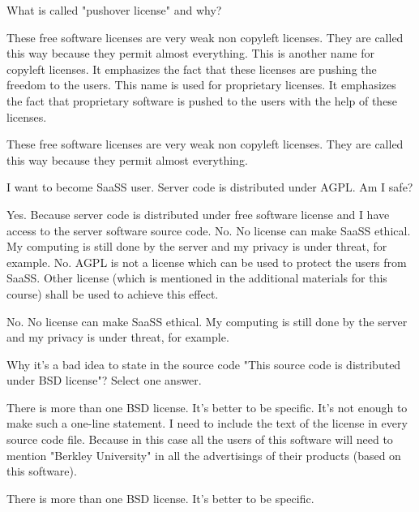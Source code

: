 \begin{question}[type=exam]
What is called "pushover license" and why?
\begin{itemize}
\chk These free software licenses are very weak non copyleft licenses. They are called this way because they permit almost everything.
\chk This is another name for copyleft licenses. It emphasizes the fact that these licenses are pushing the freedom to the users.
\chk This name is used for proprietary licenses. It emphasizes the fact that proprietary software is pushed to the users with the help of these licenses.
\end{itemize}
\end{question}
\begin{solution}
These free software licenses are very weak non copyleft licenses. They are called this way because they permit almost everything.
\end{solution}


\begin{question}[type=exam]
I want to become SaaSS user. Server code is distributed under AGPL. Am I safe?
\begin{itemize}
\chk Yes. Because server code is distributed under free software license and I have access to the server software source code.
\chk No. No license can make SaaSS ethical. My computing is still done by the server and my privacy is under threat, for example.
\chk No. AGPL is not a license which can be used to protect the users from SaaSS. Other license (which is mentioned in the additional materials for this course) shall be used to achieve this effect.
\end{itemize}
\end{question}
\begin{solution}
No. No license can make SaaSS ethical. My computing is still done by the server and my privacy is under threat, for example.
\end{solution}


\begin{question}[type=exam]
Why it's a bad idea to state in the source code "This source code is distributed under BSD license"? Select one answer.
\begin{itemize}
\chk There is more than one BSD license. It's better to be specific.
\chk It's not enough to make such a one-line statement. I need to include the text of the license in every source code file.
\chk Because in this case all the users of this software will need to mention "Berkley University" in all the advertisings of their products (based on this software).
\end{itemize}
\end{question}
\begin{solution}
There is more than one BSD license. It's better to be specific.
\end{solution}


